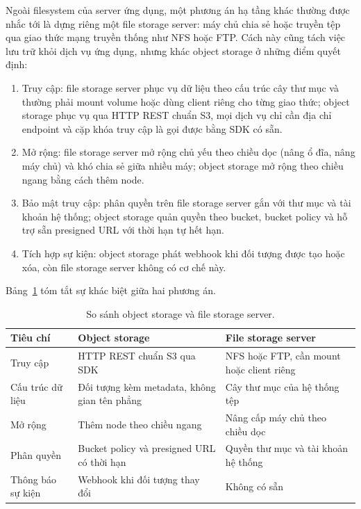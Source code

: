 \documentclass[../BTL.tex]{subfiles}
\begin{document}
Ngoài filesystem của server ứng dụng, một phương án hạ tầng khác thường được nhắc tới là dựng riêng một file storage server: máy chủ chia sẻ hoặc truyền tệp qua giao thức mạng truyền thống như NFS hoặc FTP. Cách này cũng tách việc lưu trữ khỏi dịch vụ ứng dụng, nhưng khác object storage ở những điểm quyết định:
\begin{enumerate}
    \item Truy cập: file storage server phục vụ dữ liệu theo cấu trúc cây thư mục và thường phải mount volume hoặc dùng client riêng cho từng giao thức; object storage phục vụ qua HTTP REST chuẩn S3, mọi dịch vụ chỉ cần địa chỉ endpoint và cặp khóa truy cập là gọi được bằng SDK có sẵn.
    \item Mở rộng: file storage server mở rộng chủ yếu theo chiều dọc (nâng ổ đĩa, nâng máy chủ) và khó chia sẻ giữa nhiều máy; object storage mở rộng theo chiều ngang bằng cách thêm node.
    \item Bảo mật truy cập: phân quyền trên file storage server gắn với thư mục và tài khoản hệ thống; object storage quản quyền theo bucket, bucket policy và hỗ trợ sẵn presigned URL với thời hạn tự hết hạn.
    \item Tích hợp sự kiện: object storage phát webhook khi đối tượng được tạo hoặc xóa, còn file storage server không có cơ chế này.
\end{enumerate}

Bảng~\ref{tab:object-vs-file-storage} tóm tắt sự khác biệt giữa hai phương án.

\begin{table}[ht]
\centering
\begin{tabularx}{\textwidth}{@{}p{3.4cm}XX@{}}
\toprule
Tiêu chí & Object storage & File storage server \\
\midrule
Truy cập & HTTP REST chuẩn S3 qua SDK & NFS hoặc FTP, cần mount hoặc client riêng \\
Cấu trúc dữ liệu & Đối tượng kèm metadata, không gian tên phẳng & Cây thư mục của hệ thống tệp \\
Mở rộng & Thêm node theo chiều ngang & Nâng cấp máy chủ theo chiều dọc \\
Phân quyền & Bucket policy và presigned URL có thời hạn & Quyền thư mục và tài khoản hệ thống \\
Thông báo sự kiện & Webhook khi đối tượng thay đổi & Không có sẵn \\
\bottomrule
\end{tabularx}
\caption{So sánh object storage và file storage server.}
\label{tab:object-vs-file-storage}
\end{table}
\end{document}

